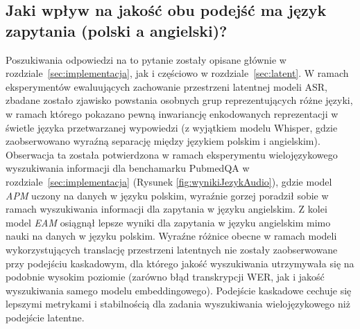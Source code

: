 \subsection{Jaki wpływ na jakość obu podejść ma język zapytania (polski a angielski)?}
Poszukiwania odpowiedzi na to pytanie zostały opisane głównie w rozdziale~\ref{sec:implementacja}, jak i częściowo w rozdziale~\ref{sec:latent}. W ramach eksperymentów ewaluujących zachowanie przestrzeni latentnej modeli ASR, zbadane zostało zjawisko powstania osobnych grup reprezentujących różne języki, w ramach którego pokazano pewną inwariancję enkodowanych reprezentacji w świetle języka przetwarzanej wypowiedzi (z wyjątkiem modelu Whisper, gdzie zaobserwowano wyraźną separację między językiem polskim i angielskim). Obserwacja ta została potwierdzona w ramach eksperymentu wielojęzykowego wyszukiwania informacji dla benchamarku PubmedQA w rozdziale~\ref{sec:implementacja} (Rysunek \ref{fig:wynikiJezykAudio}), gdzie model \textit{APM} uczony na danych w języku polskim, wyraźnie gorzej poradził sobie w ramach wyszukiwania informacji dla zapytania w języku angielskim. Z kolei model \textit{EAM} osiągnął lepsze wyniki dla zapytania w języku angielskim mimo nauki na danych w języku polskim. Wyraźne różnice obecne w ramach modeli wykorzystujących translację przestrzeni latentnych nie zostały zaobserwowane przy podejściu kaskadowym, dla którego jakość wyszukiwania utrzymywała się na podobnie wysokim poziomie (zarówno błąd transkrypcji WER, jak i jakość wyszukiwania samego modelu embeddingowego). Podejście kaskadowe cechuje się lepszymi metrykami i stabilnością dla zadania wyszukiwania wielojęzykowego niż podejście latentne.

